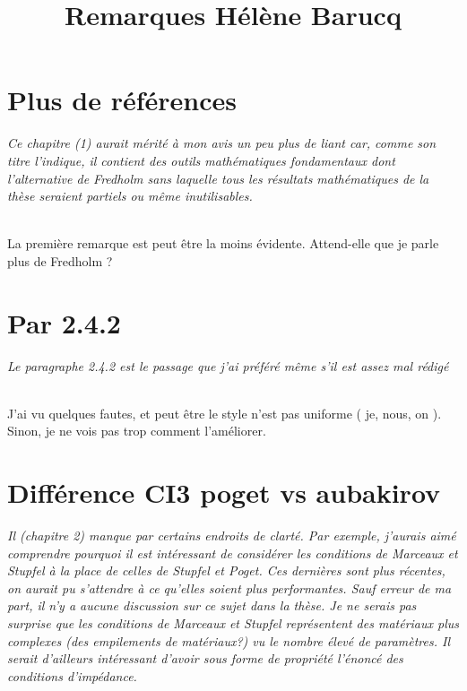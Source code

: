 \documentclass{article}
\title{Remarques Hélène Barucq}
\date{}
\newenvironment{REM}{\itshape}{}
\newenvironment{REP}{~{}\\}{}
\begin{document}
\maketitle

\section{Plus de références}
\begin{REM}
    Ce chapitre (1) aurait mérité à mon avis un peu plus de liant car, comme son titre l’indique, il contient des outils mathématiques fondamentaux dont l’alternative de Fredholm sans laquelle tous les résultats mathématiques de la thèse seraient partiels ou même inutilisables.
\end{REM}

\begin{REP}
    La première remarque est peut être la moins évidente.
    Attend-elle que je parle plus de Fredholm ?
\end{REP}

\section{Par 2.4.2}
\begin{REM}
    Le paragraphe 2.4.2 est le passage que j’ai préféré même s’il est assez mal rédigé
\end{REM}

\begin{REP}
    J'ai vu quelques fautes, et peut être le style n'est pas uniforme (  je,  nous,  on ). Sinon, je ne vois pas trop comment l'améliorer.
\end{REP}

\section{Différence CI3 poget vs aubakirov}
\begin{REM}
    Il (chapitre 2) manque par certains endroits de clarté.
    Par exemple, j’aurais aimé comprendre pourquoi il est intéressant de considérer les conditions de Marceaux et Stupfel à la place de celles de Stupfel et Poget.
    Ces dernières sont plus récentes, on
    aurait pu s’attendre à ce qu’elles soient plus performantes.
    Sauf erreur de ma part, il n’y a aucune discussion sur ce sujet dans la thèse.
    Je ne serais pas surprise que les conditions de Marceaux et Stupfel représentent des matériaux plus complexes (des empilements de matériaux?) vu le nombre élevé de paramètres.
    Il serait d’ailleurs intéressant d’avoir sous forme de propriété l’énoncé des conditions d’impédance.
\end{REM}
\end{document}
